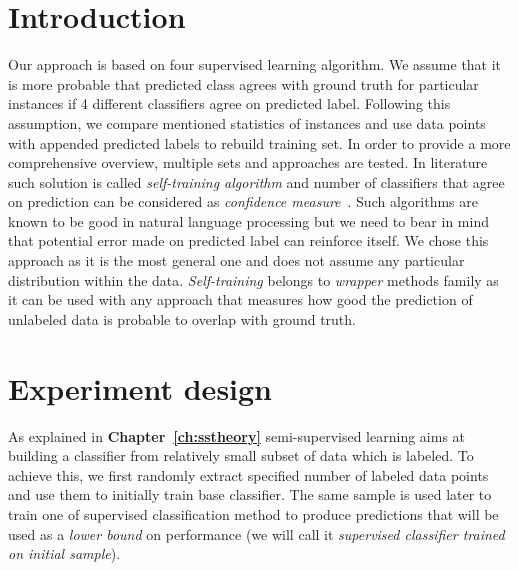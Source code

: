 \documentclass[12pt, a4paper, pdflatex]{report}
\begin{document}
\section{Introduction}
Our approach is based on four supervised learning algorithm. We assume that it is more probable that predicted class agrees with ground truth for particular instances if 4 different classifiers agree on predicted label. Following this assumption, we compare mentioned statistics of instances and use data points with appended predicted labels to rebuild training set. In order to provide a more comprehensive overview, multiple sets and approaches are tested. In literature such solution is called \emph{self-training algorithm} and number of classifiers that agree on prediction can be considered as \emph{confidence measure}~\cite{zhu2009introduction}. Such algorithms are known to be good in natural language processing but we need to bear in mind that potential error made on predicted label can reinforce itself. We chose this approach as it is the most general one and does not assume any particular distribution within the data. \emph{Self-training} belongs to \emph{wrapper} methods family as it can be used with any approach that measures how good the prediction of unlabeled data is probable to overlap with ground truth.

\section{Experiment design}
As explained in \textbf{Chapter~\ref{ch:sstheory}} semi-supervised learning aims at building a classifier from relatively small subset of data which is labeled. To achieve this, we first randomly extract specified number of labeled data points and use them to initially train base classifier. The same sample is used later to train one of supervised classification method to produce predictions that will be used as a \emph{lower bound} on performance (we will call it \emph{supervised classifier trained on initial sample}).
\end{document}
